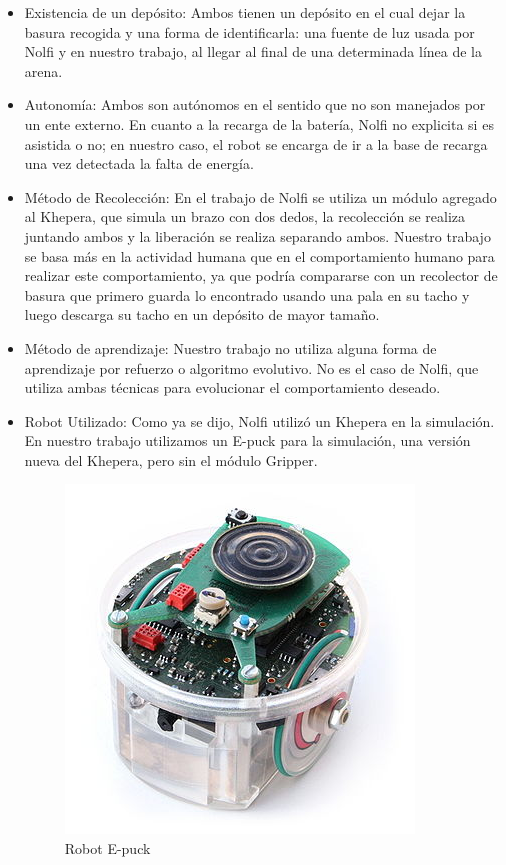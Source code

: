 \begin{itemize}

\item{Existencia de un dep\'osito:} Ambos tienen un dep\'osito en el cual dejar
la basura recogida y una forma de identificarla: una fuente de luz usada por
Nolfi y en nuestro trabajo, al llegar al final de una determinada l\'inea de la
arena.

\item{Autonom\'ia:} Ambos son aut\'onomos en el sentido que no son manejados
por un ente externo. En cuanto a la recarga de la bater\'ia, Nolfi no explicita
si es asistida o no; en nuestro caso, el robot se encarga de ir a la base de
recarga una vez detectada la falta de energ\'ia.

\item{M\'etodo de Recolecci\'on:} En el trabajo de Nolfi se utiliza un m\'odulo
agregado al Khepera, que simula un brazo con dos dedos, la recolecci\'on se
realiza juntando ambos y la liberaci\'on se realiza separando ambos. Nuestro
trabajo se basa m\'as en la actividad humana que en el comportamiento humano
para realizar este comportamiento, ya que podr\'ia compararse con un recolector
de basura que primero guarda lo encontrado usando una pala en su tacho y luego
descarga su tacho en un dep\'osito de mayor tama\~no.

\item{M\'etodo de aprendizaje:} Nuestro trabajo no utiliza alguna forma de
aprendizaje por refuerzo o algoritmo evolutivo. No es el caso de Nolfi, que
utiliza ambas t\'ecnicas para evolucionar el comportamiento deseado.

\item{Robot Utilizado:} Como ya se dijo, Nolfi utiliz\'o un Khepera en la
simulaci\'on. En nuestro trabajo utilizamos un E-puck para la simulaci\'on,
una versi\'on nueva del Khepera, pero sin el m\'odulo Gripper.
\begin{figure}[htp]
\begin{center}
\includegraphics[scale=0.6]{comportamientos/e-puck.png}
\caption{Robot E-puck}
\label{fig:epuck}
\end{center}
\end{figure}

\end{itemize}


